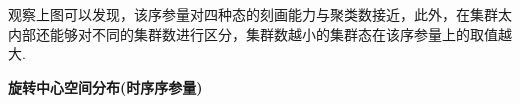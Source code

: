 \documentclass{article}
\begin{document}
观察上图可以发现，该序参量对四种态的刻画能力与聚类数接近，此外，在集群太内部还能够对不同的集群数进行区分，集群数越小的集群态在该序参量上的取值越大.


		


\newpage
\noindent\textbf{旋转中心空间分布(时序序参量)}
\end{document}
